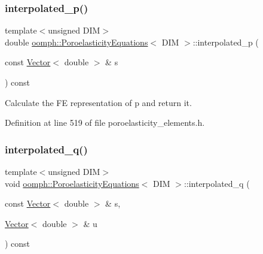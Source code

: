 \subsubsection{\texorpdfstring{interpolated\+\_\+p()}{interpolated\_p()}\hspace{0.1cm}{\footnotesize\ttfamily [2/2]}}
{\footnotesize\ttfamily template$<$unsigned D\+IM$>$ \\
double \hyperlink{classoomph_1_1PoroelasticityEquations}{oomph\+::\+Poroelasticity\+Equations}$<$ D\+IM $>$\+::interpolated\+\_\+p (\begin{DoxyParamCaption}\item[{const \hyperlink{classoomph_1_1Vector}{Vector}$<$ double $>$ \&}]{s }\end{DoxyParamCaption}) const\hspace{0.3cm}{\ttfamily [inline]}}



Calculate the FE representation of p and return it. 



Definition at line 519 of file poroelasticity\+\_\+elements.\+h.

\mbox{\label{classoomph_1_1PoroelasticityEquations_a693a649af090f9d921ed10326d8c68a5}} 
\subsubsection{\texorpdfstring{interpolated\+\_\+q()}{interpolated\_q()}\hspace{0.1cm}{\footnotesize\ttfamily [1/2]}}
{\footnotesize\ttfamily template$<$unsigned D\+IM$>$ \\
void \hyperlink{classoomph_1_1PoroelasticityEquations}{oomph\+::\+Poroelasticity\+Equations}$<$ D\+IM $>$\+::interpolated\+\_\+q (\begin{DoxyParamCaption}\item[{const \hyperlink{classoomph_1_1Vector}{Vector}$<$ double $>$ \&}]{s,  }\item[{\hyperlink{classoomph_1_1Vector}{Vector}$<$ double $>$ \&}]{u }\end{DoxyParamCaption}) const\hspace{0.3cm}{\ttfamily [inline]}}



